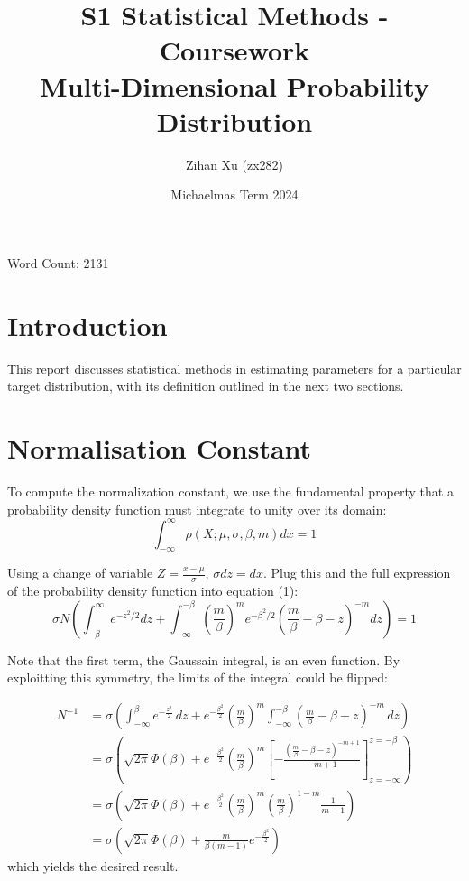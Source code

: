 \documentclass[a4paper, 12pt]{article}
\title{S1 Statistical Methods - Coursework \\ Multi-Dimensional Probability Distribution}
\author{Zihan Xu (zx282)}
\date{Michaelmas Term 2024}
\begin{document}
\maketitle
\begin{center}
    Word Count: 2131
\end{center}

\section{Introduction}
\hspace{1.5em}This report discusses statistical methods in estimating parameters for a particular target distribution, with its definition outlined in the next two sections. 
\section{Normalisation Constant}
\hspace{1.5em}To compute the normalization constant, we use the fundamental property that a probability density function must integrate to unity over its domain:
\begin{equation}
    \int_{-\infty}^{\infty} \rho (X;\mu,\sigma,\beta, m) dx = 1
\end{equation}
\par Using a change of variable $Z = \frac{x-\mu}{\sigma}$, $\sigma dz = dx$. Plug this and the full expression of the probability density function into equation (1):
\\
\begin{equation*}
    \sigma N (\int_{-\beta}^{\infty} e^{-z^{2}/2}dz + \int_{-\infty}^{-\beta}(\frac{m}{\beta})^{m}e^{-\beta^{2}/2} (\frac{m}{\beta} - \beta - z)^{-m} dz) = 1
\end{equation*}
\par Note that the first term, the Gaussain integral, is an even function. By exploitting this symmetry, the limits of the integral could be flipped: 

\begin{align*}
    N^{-1} &= \sigma \left( \int_{-\infty}^{\beta} e^{-\frac{z^2}{2}} \, dz 
    + e^{-\frac{\beta^2}{2}} \left( \frac{m}{\beta} \right)^m 
    \int_{-\infty}^{-\beta} \left( \frac{m}{\beta} - \beta - z \right)^{-m} \, dz \right) \\
    &= \sigma \left( \sqrt{2\pi} \Phi(\beta) + e^{-\frac{\beta^2}{2}} 
    \left( \frac{m}{\beta} \right)^m 
    \left[ -\frac{\left( \frac{m}{\beta} - \beta - z \right)^{-m+1}}{-m + 1} \right]_{z=-\infty}^{z=-\beta} \right) \\
    &= \sigma \left( \sqrt{2\pi} \Phi(\beta) + e^{-\frac{\beta^2}{2}} 
    \left( \frac{m}{\beta} \right)^m \left( \frac{m}{\beta} \right)^{1-m} \frac{1}{m-1} \right) \\
    &= \sigma \left( \sqrt{2\pi} \Phi(\beta) + \frac{m}{\beta (m-1)} e^{-\frac{\beta^2}{2}} \right)
\end{align*}
which yields the desired result. 
\end{document}

